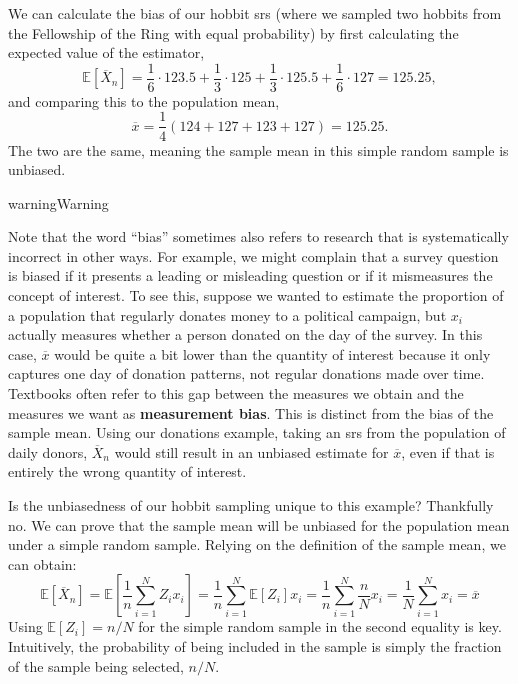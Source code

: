 \documentclass[
  13pt,
  letterpaper,
  DIV=11,
  numbers=noendperiod]{scrreprt}
\newcommand{\E}{\mathbb{E}}
\newcommand{\Xbar}{\overline{X}}
\theoremstyle{plain}
\theoremstyle{plain}
\theoremstyle{definition}
\theoremstyle{definition}
\theoremstyle{remark}
\begin{document}
We can calculate the bias of our hobbit srs (where we sampled two
hobbits from the Fellowship of the Ring with equal probability) by first
calculating the expected value of the estimator, \[
\E[\Xbar_{n}] = \frac{1}{6}\cdot 123.5 + \frac{1}{3} \cdot 125 + \frac{1}{3} \cdot 125.5 + \frac{1}{6} \cdot 127 = 125.25,
\] and comparing this to the population mean, \[
\overline{x} = \frac{1}{4}\left(124 + 127 + 123 + 127\right) = 125.25.
\] The two are the same, meaning the sample mean in this simple random
sample is unbiased.

\begin{bookcallout}{warning}{Warning}

Note that the word ``bias'' sometimes also refers to research that is
systematically incorrect in other ways. For example, we might complain
that a survey question is biased if it presents a leading or misleading
question or if it mismeasures the concept of interest. To see this,
suppose we wanted to estimate the proportion of a population that
regularly donates money to a political campaign, but \(x_i\) actually
measures whether a person donated on the day of the survey. In this
case, \(\overline{x}\) would be quite a bit lower than the quantity of
interest because it only captures one day of donation patterns, not
regular donations made over time. Textbooks often refer to this gap
between the measures we obtain and the measures we want as
\textbf{measurement bias}. This is distinct from the bias of the sample
mean. Using our donations example, taking an srs from the population of
daily donors, \(\Xbar_{n}\) would still result in an unbiased estimate
for \(\overline{x}\), even if that is entirely the wrong quantity of
interest.

\end{bookcallout}

Is the unbiasedness of our hobbit sampling unique to this example?
Thankfully no. We can prove that the sample mean will be unbiased for
the population mean under a simple random sample. Relying on the
definition of the sample mean, we can obtain: \[ 
\E[\Xbar_{n}] = \E\left[\frac{1}{n} \sum_{i=1}^{N} Z_{i}x_{i}\right] = \frac{1}{n} \sum_{i=1}^{N} \E[Z_{i}]x_{i} = \frac{1}{n} \sum_{i=1}^{N} \frac{n}{N}x_{i} = \frac{1}{N} \sum_{i=1}^{N}x_{i} = \overline{x} 
\] Using \(\E[Z_i] = n/N\) for the simple random sample in the second
equality is key. Intuitively, the probability of being included in the
sample is simply the fraction of the sample being selected, \(n/N\).
\end{document}
